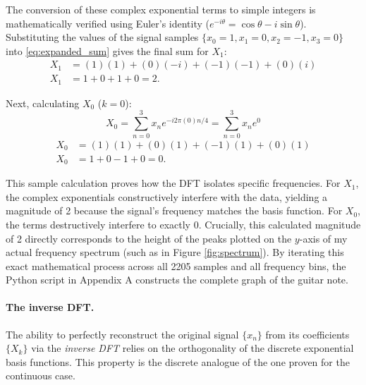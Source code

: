 \documentclass{article}
\begin{document}
The conversion of these complex exponential terms to simple integers is mathematically verified using Euler's identity ($e^{-i\theta} = \cos\theta - i\sin\theta$). Substituting the values of the signal samples $\{x_0=1, x_1=0, x_2=-1, x_3=0\}$ into \eqref{eq:expanded_sum} gives the final sum for $X_1$:
\begin{align*}
    X_1 &= (1)(1) + (0)(-i) + (-1)(-1) + (0)(i) \\
    X_1 &= 1 + 0 + 1 + 0 = 2.
\end{align*}

Next, calculating $X_0$ ($k=0$):
\begin{equation*}
    X_0 = \sum_{n=0}^{3} x_n e^{-i 2\pi (0) n / 4} = \sum_{n=0}^{3} x_n e^0
\end{equation*}
\begin{align*}
    X_0 &= (1)(1) + (0)(1) + (-1)(1) + (0)(1) \\
    X_0 &= 1 + 0 - 1 + 0 = 0.
\end{align*}

This sample calculation proves how the DFT isolates specific frequencies. For $X_1$, the complex exponentials constructively interfere with the data, yielding a magnitude of 2 because the signal's frequency matches the basis function. For $X_0$, the terms destructively interfere to exactly $0$. Crucially, this calculated magnitude of 2 directly corresponds to the height of the peaks plotted on the $y$-axis of my actual frequency spectrum (such as in Figure \ref{fig:spectrum}). By iterating this exact mathematical process across all 2205 samples and all frequency bins, the Python script in Appendix A constructs the complete graph of the guitar note.

\paragraph{The inverse DFT.}
The ability to perfectly reconstruct the original signal $\{x_n\}$ from its coefficients $\{X_k\}$ via the \emph{inverse DFT} relies on the orthogonality of the discrete exponential basis functions. This property is the discrete analogue of the one proven for the continuous case.
\end{document}
